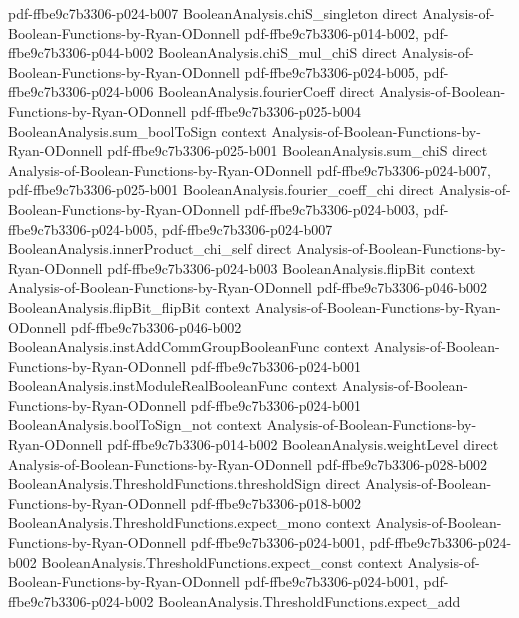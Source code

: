 \begin{theorem}
  {pdf-ffbe9c7b3306-p024-b007}
\proofstep
  {BooleanAnalysis.chiS_singleton}
  {direct}
  {Analysis-of-Boolean-Functions-by-Ryan-ODonnell}
  {pdf-ffbe9c7b3306-p014-b002,
    pdf-ffbe9c7b3306-p044-b002}
\proofstep
  {BooleanAnalysis.chiS_mul_chiS}
  {direct}
  {Analysis-of-Boolean-Functions-by-Ryan-ODonnell}
  {pdf-ffbe9c7b3306-p024-b005,
    pdf-ffbe9c7b3306-p024-b006}
\proofstep
  {BooleanAnalysis.fourierCoeff}
  {direct}
  {Analysis-of-Boolean-Functions-by-Ryan-ODonnell}
  {pdf-ffbe9c7b3306-p025-b004}
\proofstep
  {BooleanAnalysis.sum_boolToSign}
  {context}
  {Analysis-of-Boolean-Functions-by-Ryan-ODonnell}
  {pdf-ffbe9c7b3306-p025-b001}
\proofstep
  {BooleanAnalysis.sum_chiS}
  {direct}
  {Analysis-of-Boolean-Functions-by-Ryan-ODonnell}
  {pdf-ffbe9c7b3306-p024-b007,
    pdf-ffbe9c7b3306-p025-b001}
\proofstep
  {BooleanAnalysis.fourier_coeff_chi}
  {direct}
  {Analysis-of-Boolean-Functions-by-Ryan-ODonnell}
  {pdf-ffbe9c7b3306-p024-b003,
    pdf-ffbe9c7b3306-p024-b005,
    pdf-ffbe9c7b3306-p024-b007}
\proofstep
  {BooleanAnalysis.innerProduct_chi_self}
  {direct}
  {Analysis-of-Boolean-Functions-by-Ryan-ODonnell}
  {pdf-ffbe9c7b3306-p024-b003}
\proofstep
  {BooleanAnalysis.flipBit}
  {context}
  {Analysis-of-Boolean-Functions-by-Ryan-ODonnell}
  {pdf-ffbe9c7b3306-p046-b002}
\proofstep
  {BooleanAnalysis.flipBit_flipBit}
  {context}
  {Analysis-of-Boolean-Functions-by-Ryan-ODonnell}
  {pdf-ffbe9c7b3306-p046-b002}
\proofstep
  {BooleanAnalysis.instAddCommGroupBooleanFunc}
  {context}
  {Analysis-of-Boolean-Functions-by-Ryan-ODonnell}
  {pdf-ffbe9c7b3306-p024-b001}
\proofstep
  {BooleanAnalysis.instModuleRealBooleanFunc}
  {context}
  {Analysis-of-Boolean-Functions-by-Ryan-ODonnell}
  {pdf-ffbe9c7b3306-p024-b001}
\proofstep
  {BooleanAnalysis.boolToSign_not}
  {context}
  {Analysis-of-Boolean-Functions-by-Ryan-ODonnell}
  {pdf-ffbe9c7b3306-p014-b002}
\proofstep
  {BooleanAnalysis.weightLevel}
  {direct}
  {Analysis-of-Boolean-Functions-by-Ryan-ODonnell}
  {pdf-ffbe9c7b3306-p028-b002}
\proofstep
  {BooleanAnalysis.ThresholdFunctions.thresholdSign}
  {direct}
  {Analysis-of-Boolean-Functions-by-Ryan-ODonnell}
  {pdf-ffbe9c7b3306-p018-b002}
\proofstep
  {BooleanAnalysis.ThresholdFunctions.expect_mono}
  {context}
  {Analysis-of-Boolean-Functions-by-Ryan-ODonnell}
  {pdf-ffbe9c7b3306-p024-b001,
    pdf-ffbe9c7b3306-p024-b002}
\proofstep
  {BooleanAnalysis.ThresholdFunctions.expect_const}
  {context}
  {Analysis-of-Boolean-Functions-by-Ryan-ODonnell}
  {pdf-ffbe9c7b3306-p024-b001,
    pdf-ffbe9c7b3306-p024-b002}
\proofstep
  {BooleanAnalysis.ThresholdFunctions.expect_add}

\end{theorem}
